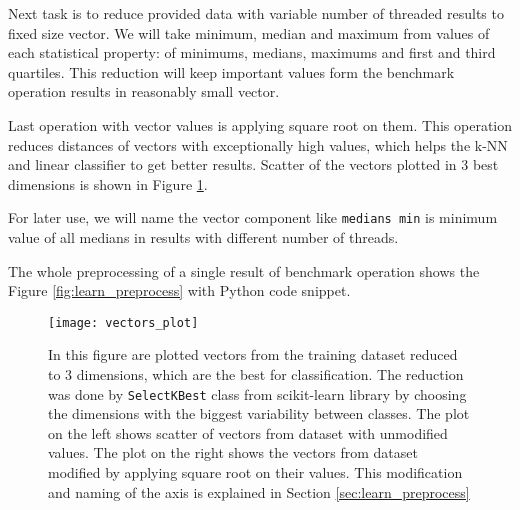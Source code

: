 Next task is to reduce provided data with variable number of threaded results
to fixed size vector. We will take minimum, median and maximum from values of
each statistical property: of minimums, medians, maximums and first and third
quartiles. This reduction will keep important values form the benchmark
operation results in reasonably small vector.

Last operation with vector values is applying square root on them. This
operation reduces distances of vectors with exceptionally high values, which
helps the k-NN and linear classifier to get better results. Scatter of the
vectors plotted in 3 best dimensions is shown in Figure \ref{fig:vectors_plot}.

For later use, we will name the vector component like \texttt{medians min} is
minimum value of all medians in results with different number of threads.

The whole preprocessing of a single result of benchmark operation shows the
Figure \ref{fig:learn_preprocess} with Python code snippet.

\begin{figure}
  \centering
  \texttt{[image: vectors\_plot]}
  \caption{In this figure are plotted vectors from the training dataset reduced
    to 3 dimensions, which are the best for classification. The reduction was done by
    \texttt{SelectKBest} class from scikit-learn library by choosing the
    dimensions with the biggest variability between classes. The plot on the
    left shows scatter of vectors from dataset with unmodified values. The plot
    on the right shows the vectors from dataset modified by applying square root
    on their values. This modification and naming of the axis is explained in
    Section \ref{sec:learn_preprocess}}
  \label{fig:vectors_plot}
\end{figure}

